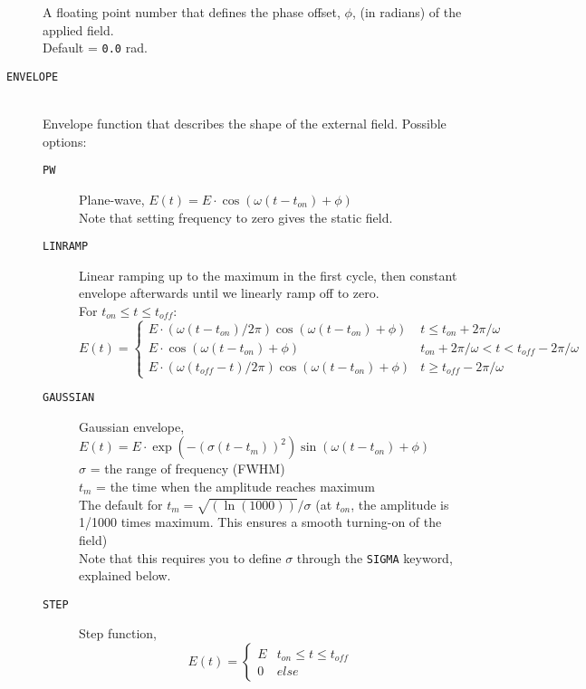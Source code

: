 \documentclass[12pt]{article}
\begin{document}
\begin{description}
        A floating point number that defines the phase offset, $\phi$, (in radians) of the applied field. \\
        Default = \texttt{0.0} rad.
      \item[\texttt{ENVELOPE}] \hfill \\ 
        Envelope function that describes the shape of the external field. Possible options:
        \begin{description}
          \item[\texttt{PW}] Plane-wave, $E(t) = E \cdot \cos(\omega (t - t_{on}) + \phi)$ \\
            Note that setting frequency to zero gives the static field.
          \item[\texttt{LINRAMP}] Linear ramping up to the maximum in the first cycle, then constant envelope afterwards until we linearly ramp off to zero. \\
            For $t_{on} \leq t \leq t_{off}$: \\
            \begin{equation*}
            E(t) = \begin{cases}
              E \cdot (\omega(t - t_{on})/2\pi) \cos(\omega (t - t_{on}) + \phi)  & t\leq t_{on} + 2\pi/\omega\\
              E \cdot \cos(\omega (t - t_{on}) + \phi)  & t_{on} + 2\pi/\omega < t < t_{off} - 2\pi/\omega\\
              E \cdot (\omega(t_{off} - t)/2\pi) \cos(\omega (t - t_{on}) + \phi)  & t \geq t_{off} - 2\pi/\omega  
            \end{cases}
            \end{equation*}
 
          \item[\texttt{GAUSSIAN}] Gaussian envelope, $E(t) = E \cdot \exp{(-(\sigma ( t - t_{m}))^{2})} \sin(\omega (t - t_{on}) + \phi)$ \hfill \\
           $\sigma$  = the range of frequency (FWHM) \\
           $t_m$ = the time when the amplitude reaches maximum \\
                  The default for $t_m = \sqrt{(\ln(1000))}/\sigma$ 
                  (at $t_{on}$, the amplitude is 1/1000 times maximum. This ensures a smooth turning-on of the field) \\
           Note that this requires you to define $\sigma$ through the \texttt{SIGMA} keyword, explained below.
          \item[\texttt{STEP}] Step function,
            \begin{equation*}
            E(t) = \begin{cases}
              E  & t_{on} \leq t \leq t_{off} \\
              0  & else 
            \end{cases}
            \end{equation*}
        \end{description}


\end{description}
\end{document}
